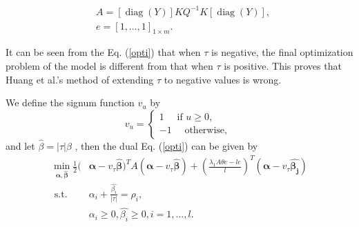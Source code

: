 \documentclass[fleqn,10pt]{wlscirepp}
\begin{document}
\begin{equation}
\label{computeA}
\begin{aligned}
&A=[\operatorname{diag}(Y)] K Q^{-1} K[\operatorname{diag}(Y)], \\
&e=[1, \ldots, 1]_{1 \times m}.
\end{aligned}
\end{equation}

It can be seen from the Eq. (\ref{opti}) that when $\tau$ is negative, the final optimization problem of the model is different from that when $\tau$ is positive. This proves that Huang et al.'s method of extending $\tau$ to negative values \citep{huang2016solution} is wrong.

We define the signum function $v_{u}$ by
\begin{equation}
v_{u}=\left\{\begin{array}{l}
1 \quad \text { if } u \geq 0, \\
-1 \quad \text { otherwise, }
\end{array}\right.
\end{equation}
and let $\hat{\beta}=|\tau| \beta$ , then the dual Eq. (\ref{opti}) can be given by
\begin{equation}
\label{dual}
\begin{aligned}
\min _{\boldsymbol{\alpha, \hat{\beta}}} \frac{1}{2}( & \boldsymbol{\alpha}-v_{\tau} \boldsymbol{\hat{\beta}})^{T} A(\boldsymbol{\alpha}-v_{\tau}\boldsymbol{\hat{\beta}})+\left(\frac{\lambda_{1} A\mathbb{\theta}e-l e}{l}\right)^{T}(\boldsymbol{\alpha}-v_{\tau} \boldsymbol{\hat{\beta_{j}}}) \\
\text { s.t. } \quad & \alpha_{i}+\frac{\hat{\beta_{i}}}{|\tau|}=\rho_{i}, \\
& \alpha_{i} \geq 0, \hat{\beta_{i}} \geq 0, i=1, \ldots, l.
\end{aligned}
\end{equation}





\clearpage
% 
\end{document}
